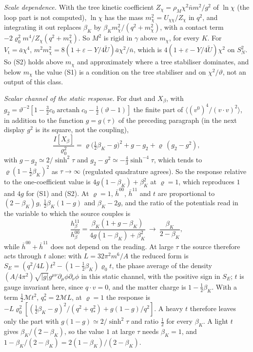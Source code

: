 \emph{Scale dependence.} With the tree kinetic coefficient \(Z_\chi=\rho_M\chi^2\bar nm^2/g^2\) of \(\ln\chi\) (the loop part is not computed), \(\ln\chi\) has the mass \(m_\chi^2=U_{\chi\chi}/Z_\chi\) in \(q^2\), and integrating it out replaces \(\beta_K\) by \(\beta_Km_\chi^2/(q^2+m_\chi^2)\), with a contact term \(-2\varrho_0^2m^4/Z_\chi(q^2+m_\chi^2)\). So \(M^2\) is rigid in \(\gamma\) above \(m_\chi\), for every \(K\). For \(V_{\mathrm t}=\bar a\chi^4\), \(m^2m_\chi^2=8(1+\varepsilon-Y/4\tilde U)\bar a\chi^2/\bar n\), which is \(4(1+\varepsilon-Y/4\tilde U)\chi^2\) on \(S^2_N\). So (S2) holds above \(m_\chi\) and approximately where a tree stabiliser dominates, and below \(m_\chi\) the value (S1) is a condition on the tree stabiliser and on \(\chi^2/\vartheta\), not an output of this class.

\emph{Scalar channel of the static response.} For dust and \(X_\beta\), with \(g_2=\vartheta^{-2}[1-\tfrac32c_0\operatorname{arctanh}c_0-\tfrac12(\vartheta-1)]\) the finite part of \(\langle(v^0)^4/(v\cdot v)^2\rangle\), in addition to the function \(g=g(\tau)\) of the preceding paragraph (in the next display \(g^2\) is its square, not the coupling),
\[
\frac{I[X_\beta]}{\varrho_0^2}=\varrho\bigl(\tfrac12\beta_K-g\bigr)^2+g-g_2+\varrho\,(g_2-g^2),
\]
with \(g-g_2\simeq2/\sinh^2\tau\) and \(g_2-g^2\simeq-\tfrac43\sinh^{-4}\tau\), which tends to \(\varrho(1-\tfrac12\beta_K)^2\) as \(\tau\to\infty\) (regulated quadrature agrees). So the response relative to the one-coefficient value is \(4g(1-\beta_K)+\beta_K^2\) at \(\varrho=1\), which reproduces \(1\) and \(4g\) for (S1) and (S2). At \(\varrho=1\), \(\bar h^{00}\), \(\bar h^{11}\) and \(t\) are proportional to \((2-\beta_K)g\), \(\tfrac12\beta_K(1-g)\) and \(\beta_K-2g\), and the ratio of the potentials read in the variable to which the source couples is
\[
\frac{h_\beta^{11}}{h_\beta^{00}}=\frac{\beta_K(1+g-\beta_K)}{4g(1-\beta_K)+\beta_K^2}\ \longrightarrow\ \frac{\beta_K}{2-\beta_K},
\]
while \(\bar h^{00}+\bar h^{11}\) does not depend on the reading. At large \(\tau\) the source therefore acts through \(t\) alone: with \(L=32\pi^2m^6/A\) the reduced form is \(S_E=(q^2/4L)t^2-(1-\tfrac12\beta_K)\varrho_0t\), the phase average of the density \((A/4\pi^2)\sqrt{|g|}g^{\mu\nu}\partial_\mu\phi\partial_\nu\phi\) in this static channel, with the positive sign in \(S_E\); \(t\) is gauge invariant here, since \(q\cdot v=0\), and the matter charge is \(1-\tfrac12\beta_K\). With a term \(\tfrac12\mathcal Mt^2\), \(q_*^2=2\mathcal ML\), at \(\varrho=1\) the response is \(-L\varrho_0^2[(\tfrac12\beta_K-g)^2/(q^2+q_*^2)+g(1-g)/q^2]\). A heavy \(t\) therefore leaves only the part with \(g(1-g)\simeq2/\sinh^2\tau\) and ratio \(\tfrac12\) for every \(\beta_K\). A light \(t\) gives \(\beta_K/(2-\beta_K)\), so the value \(1\) at large \(\tau\) needs \(\beta_K=1\), and \(1-\beta_K/(2-\beta_K)=2(1-\beta_K)/(2-\beta_K)\).

